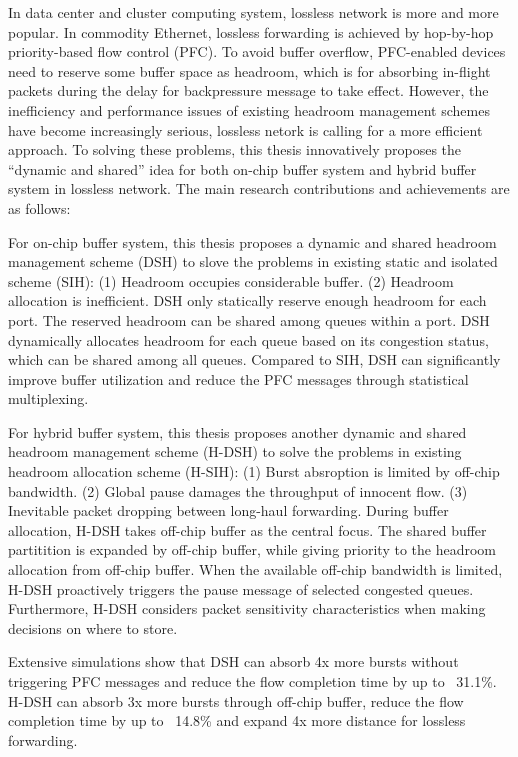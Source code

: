 
\begin{englishabstract}
    In data center and cluster computing system, lossless network is more and more popular. In commodity Ethernet, lossless forwarding is achieved by hop-by-hop priority-based flow control (PFC). To avoid buffer overflow, PFC-enabled devices need to reserve some buffer space as headroom, which is for absorbing in-flight packets during the delay for backpressure message to take effect. However, the inefficiency and performance issues of existing headroom management schemes have become increasingly serious, lossless netork is calling for a more efficient approach. To solving these problems, this thesis innovatively proposes the ``dynamic and shared'' idea for both on-chip buffer system and hybrid buffer system in lossless network. The main research contributions and achievements are as follows:
    
    For on-chip buffer system, this thesis proposes a dynamic and shared headroom management scheme (DSH) to slove the problems in existing static and isolated scheme (SIH): (1) Headroom occupies considerable buffer. (2) Headroom allocation is inefficient. DSH only statically reserve enough headroom for each port. The reserved headroom can be shared among queues within a port. DSH dynamically allocates headroom for each queue based on its congestion status, which can be shared among all queues. Compared to SIH, DSH can significantly improve buffer utilization and reduce the PFC messages through statistical multiplexing.
        
    For hybrid buffer system, this thesis proposes another dynamic and shared headroom management scheme (H-DSH) to solve the problems in existing headroom allocation scheme (H-SIH): (1) Burst absroption is limited by off-chip bandwidth. (2) Global pause damages the throughput of innocent flow. (3) Inevitable packet dropping between long-haul forwarding. During buffer allocation, H-DSH takes off-chip buffer as the central focus. The shared buffer partitition is expanded by off-chip buffer, while giving priority to the headroom allocation from off-chip buffer. When the available off-chip bandwidth is limited, H-DSH proactively triggers the pause message of selected congested queues. Furthermore, H-DSH considers packet sensitivity characteristics when making decisions on where to store.
    
    Extensive simulations show that DSH can absorb 4x more bursts without triggering PFC messages and reduce the flow completion time by up to ~31.1\%. H-DSH can absorb 3x more bursts through off-chip buffer, reduce the flow completion time by up to ~14.8\% and expand 4x more distance for lossless forwarding.  
    

\end{englishabstract}